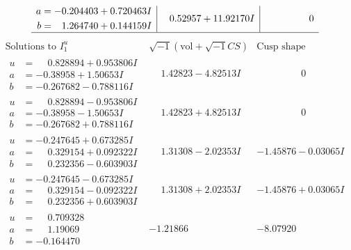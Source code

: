 \documentclass[1p]{elsarticle_modified}
\theoremstyle{definition}
\newcommand{\I}{\sqrt{-1}}
\begin{document}
$$\begin{array}{c|c|c}
\begin{aligned}
a &= -0.204403 + 0.720463 I \\
b &= \phantom{-}1.264740 + 0.144159 I\end{aligned}
 & \phantom{-}0.52957 + 11.92170 I & \phantom{-0.000000 } 0\\
 \hline 
 \end{array}$$\newpage$$\begin{array}{c|c|c}  
\text{Solutions to }I^u_{1}& \I (\text{vol} + \sqrt{-1}CS) & \text{Cusp shape}\\
 \hline 
\begin{aligned}
u &= \phantom{-}0.828894 + 0.953806 I \\
a &= -0.38958 + 1.50653 I \\
b &= -0.267682 - 0.788116 I\end{aligned}
 & \phantom{-}1.42823 - 4.82513 I & \phantom{-0.000000 } 0 \\ \hline\begin{aligned}
u &= \phantom{-}0.828894 - 0.953806 I \\
a &= -0.38958 - 1.50653 I \\
b &= -0.267682 + 0.788116 I\end{aligned}
 & \phantom{-}1.42823 + 4.82513 I & \phantom{-0.000000 } 0 \\ \hline\begin{aligned}
u &= -0.247645 + 0.673285 I \\
a &= \phantom{-}0.329154 + 0.092322 I \\
b &= \phantom{-}0.232356 - 0.603903 I\end{aligned}
 & \phantom{-}1.31308 - 2.02353 I & -1.45876 - 0.03065 I \\ \hline\begin{aligned}
u &= -0.247645 - 0.673285 I \\
a &= \phantom{-}0.329154 - 0.092322 I \\
b &= \phantom{-}0.232356 + 0.603903 I\end{aligned}
 & \phantom{-}1.31308 + 2.02353 I & -1.45876 + 0.03065 I \\ \hline\begin{aligned}
u &= \phantom{-}0.709328\phantom{ +0.000000I} \\
a &= \phantom{-}1.19069\phantom{ +0.000000I} \\
b &= -0.164470\phantom{ +0.000000I}\end{aligned}
 & -1.21866\phantom{ +0.000000I} & -8.07920\phantom{ +0.000000I} \\ \hline\begin{aligned}

\end{aligned}
\end{array}$$
\end{document}
